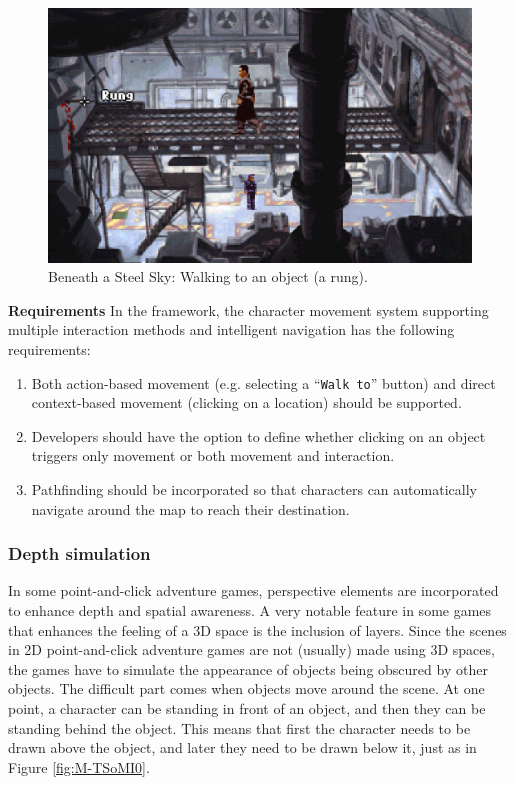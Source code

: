 \begin{figure}[H]
\centering
\includegraphics[width=.75\linewidth]{img/M-BaSS.png}
\caption{Beneath a Steel Sky: Walking to an object (a rung).}
\label{fig:M-BaSS}
\end{figure}

\textbf{Requirements} \quad In the framework, the character movement system supporting multiple interaction methods and intelligent navigation has the following requirements:

\begin{enumerate}[label=\color{teal}\textbf{R{\arabic*}},resume]
  \item \label{intro:req:com+mouse_move} Both action-based movement (e.g. selecting a “\texttt{Walk to}” button) and direct context-based movement (clicking on a location) should be supported.
  \item \label{intro:req:mox_move} Developers should have the option to define whether clicking on an object triggers only movement or both movement and interaction.
  \item \label{intro:req:pathfinding}Pathfinding should be incorporated so that characters can automatically navigate around the map to reach their destination.
\end{enumerate}

\subsubsection{Depth simulation}
In some point-and-click adventure games, perspective elements are incorporated to enhance depth and spatial awareness. 
A very notable feature in some games that enhances the feeling of a 3D space is the inclusion of layers. Since the scenes in 2D point-and-click adventure games are not (usually) made using 3D spaces, the games have to simulate the appearance of objects being obscured by other objects. The difficult part comes when objects move around the scene. At one point, a character can be standing in front of an object, and then they can be standing behind the object. This means that first the character needs to be drawn above the object, and later they need to be drawn below it, just as in Figure \ref{fig:M-TSoMI0}.

